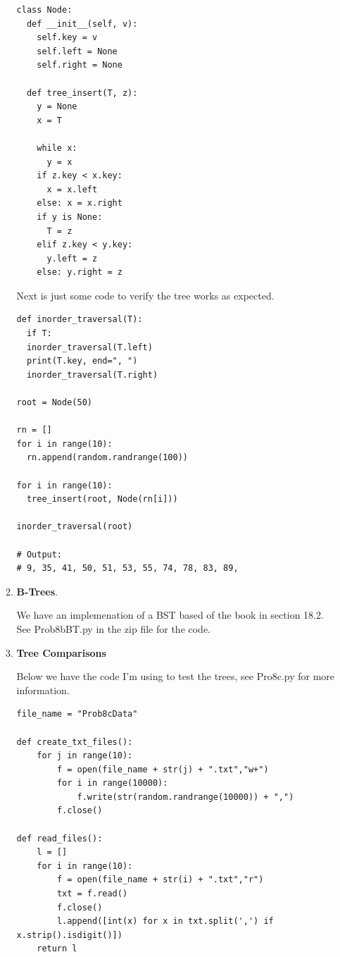 \documentclass{article}
\begin{document}
\begin{enumerate}
\begin{enumerate}
    \begin{lstlisting}
class Node: 
  def __init__(self, v): 
    self.key = v 
    self.left = None
    self.right = None
              
  def tree_insert(T, z): 
    y = None
    x = T
    
    while x:
      y = x
    if z.key < x.key:
      x = x.left
    else: x = x.right
    if y is None:
      T = z
    elif z.key < y.key:
      y.left = z
    else: y.right = z  
    \end{lstlisting}    

  Next is just some code to verify the tree works as expected.

    \begin{lstlisting}            
def inorder_traversal(T): 
  if T: 
  inorder_traversal(T.left) 
  print(T.key, end=", ") 
  inorder_traversal(T.right)  

root = Node(50)

rn = []
for i in range(10):
  rn.append(random.randrange(100))
    
for i in range(10):
  tree_insert(root, Node(rn[i]))    
    
inorder_traversal(root)

# Output:
# 9, 35, 41, 50, 51, 53, 55, 74, 78, 83, 89, 
    \end{lstlisting}  

    \item \textbf{B-Trees}.

    We have an implemenation of a BST based of the book in section 18.2.
    See Prob8bBT.py in the zip file for the code.

    \item \textbf{Tree Comparisons}
    
    Below we have the code I'm using to test the trees, see Pro8c.py for more information.

    \begin{lstlisting}
file_name = "Prob8cData"

def create_txt_files():
    for j in range(10):
        f = open(file_name + str(j) + ".txt","w+")
        for i in range(10000):
            f.write(str(random.randrange(10000)) + ",")
        f.close()

def read_files():
    l = []
    for i in range(10):
        f = open(file_name + str(i) + ".txt","r")
        txt = f.read()
        f.close()
        l.append([int(x) for x in txt.split(',') if x.strip().isdigit()])
    return l


\end{lstlisting}
\end{enumerate}
\end{enumerate}
\end{document}
